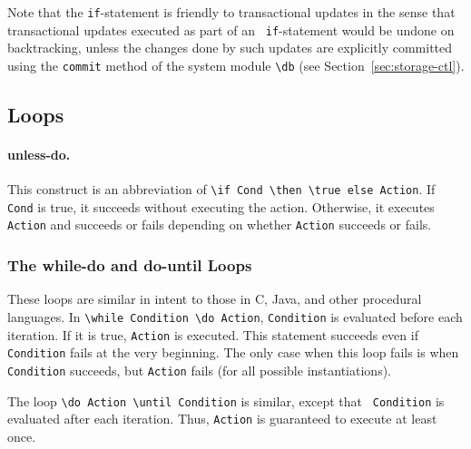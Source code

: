 \documentclass[11pt]{article}
\newcommand{\bs}{\textbackslash}
\begin{document}
Note that the {\tt if}-statement is friendly to transactional updates in
the sense that transactional updates executed as part of an {\tt
  if}-statement would be undone on backtracking, unless the changes done by
such updates are explicitly committed using the {\tt commit} method of the
system module {\tt \bs{}db} (see Section~\ref{sec:storage-ctl}).

\subsection{Loops}
\paragraph{unless-do.}
This construct is an abbreviation of {\tt \bs{}if Cond \bs{}then \bs{}true else Action}.
If {\tt Cond} is true, it succeeds without executing the action.
Otherwise, it executes {\tt Action} and succeeds or fails depending on
whether {\tt Action} succeeds or fails.

\subsubsection{The while-do and do-until Loops}

These loops are similar in intent to those in C, Java, and other procedural
languages.
In {\tt \bs{}while Condition \bs{}do Action}, {\tt Condition} is evaluated before each
iteration. If it is true, {\tt Action} is executed. This statement succeeds
even if {\tt Condition} fails at the very beginning. The only case when this
loop fails is when {\tt Condition} succeeds, but {\tt Action} fails (for all
possible instantiations).

The loop {\tt \bs{}do Action \bs{}until Condition} is similar, except that {\tt
  Condition} is evaluated after each iteration. Thus, {\tt Action} is
guaranteed to execute at least once.
\end{document}
